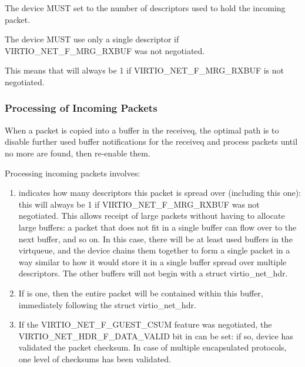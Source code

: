 The device MUST set  to the number of descriptors used to
hold the incoming packet.

The device MUST use only a single descriptor if VIRTIO_NET_F_MRG_RXBUF
was not negotiated.
\begin{note}
{This means that  will always be 1
if VIRTIO_NET_F_MRG_RXBUF is not negotiated.}
\end{note}

\subsubsection{Processing of Incoming Packets}\label{sec:Device Types / Network Device / Device Operation / Processing of Incoming Packets}
\label{sec:Device Types / Network Device / Device Operation / Processing of Packets}%

When a packet is copied into a buffer in the receiveq, the
optimal path is to disable further used buffer notifications for the
receiveq and process packets until no more are found, then re-enable
them.

Processing incoming packets involves:

\begin{enumerate}
\item {} indicates how many descriptors
  this packet is spread over (including this one): this will
  always be 1 if VIRTIO_NET_F_MRG_RXBUF was not negotiated.
  This allows receipt of large packets without having to allocate large
  buffers: a packet that does not fit in a single buffer can flow
  over to the next buffer, and so on. In this case, there will be
  at least  used buffers in the virtqueue, and the device
  chains them together to form a single packet in a way similar to
  how it would store it in a single buffer spread over multiple
  descriptors.
  The other buffers will not begin with a struct virtio_net_hdr.

\item If
   is one, then the entire packet will be
  contained within this buffer, immediately following the struct
  virtio_net_hdr.
\item If the VIRTIO_NET_F_GUEST_CSUM feature was negotiated, the
  VIRTIO_NET_HDR_F_DATA_VALID bit in  can be
  set: if so, device has validated the packet checksum.
  In case of multiple encapsulated protocols, one level of checksums
  has been validated.
\end{enumerate}

